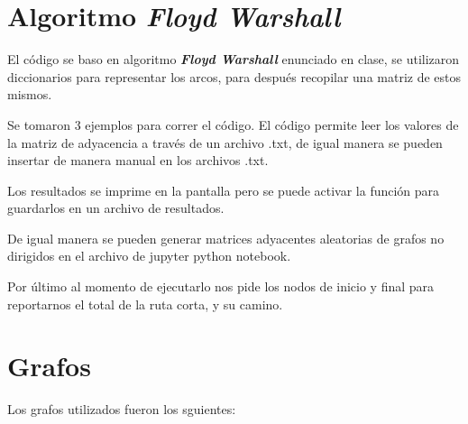 \documentclass{report}
\newcommand{\war}{ \textit{{\bfseries{Floyd Warshall}}} }
\begin{document}
\section*{Algoritmo \war}

El código se baso en algoritmo \war enunciado en clase, se utilizaron diccionarios para representar los arcos, para después recopilar una matriz de estos mismos.

Se tomaron 3 ejemplos para correr el código. El código permite leer los valores de la matriz de adyacencia a través de un archivo .txt, de igual manera se pueden insertar de manera manual en los archivos .txt.

Los resultados se imprime en la pantalla pero se puede activar la función para guardarlos en un archivo de resultados.

De igual manera se pueden generar matrices adyacentes aleatorias de grafos no dirigidos en el archivo de jupyter python notebook.

Por último al momento de ejecutarlo nos pide los nodos de inicio y final para reportarnos el total de la ruta corta, y su camino.

\section*{Grafos}

Los grafos utilizados fueron los sguientes:
\end{document}
